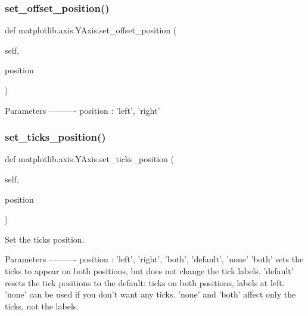 \subsubsection{\texorpdfstring{set\+\_\+offset\+\_\+position()}{set\_offset\_position()}}
{\footnotesize\ttfamily def matplotlib.\+axis.\+Y\+Axis.\+set\+\_\+offset\+\_\+position (\begin{DoxyParamCaption}\item[{}]{self,  }\item[{}]{position }\end{DoxyParamCaption})}

\begin{DoxyVerb}Parameters
----------
position : {'left', 'right'}
\end{DoxyVerb}
 \mbox{\label{classmatplotlib_1_1axis_1_1YAxis_a3c8f0de1bf4742c8a44a4a2fb2e2081e}} 
\subsubsection{\texorpdfstring{set\+\_\+ticks\+\_\+position()}{set\_ticks\_position()}}
{\footnotesize\ttfamily def matplotlib.\+axis.\+Y\+Axis.\+set\+\_\+ticks\+\_\+position (\begin{DoxyParamCaption}\item[{}]{self,  }\item[{}]{position }\end{DoxyParamCaption})}

\begin{DoxyVerb}Set the ticks position.

Parameters
----------
position : {'left', 'right', 'both', 'default', 'none'}
    'both' sets the ticks to appear on both positions, but does not
    change the tick labels.  'default' resets the tick positions to
    the default: ticks on both positions, labels at left.  'none'
    can be used if you don't want any ticks. 'none' and 'both'
    affect only the ticks, not the labels.
\end{DoxyVerb}
 \mbox{\label{classmatplotlib_1_1axis_1_1YAxis_a7dcb89bfd35e4a52a2d42b626f2e9a87}} 
